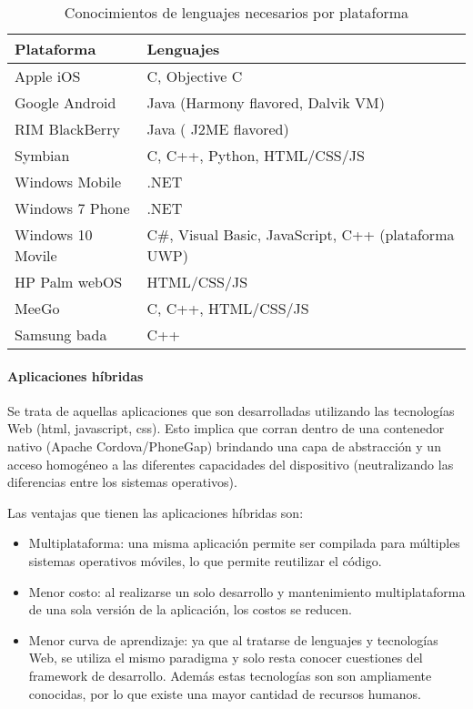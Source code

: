 \begin{table}[]
\centering
\caption{Conocimientos de lenguajes necesarios por plataforma\cite{charland2011mobile}}
\label{languajes_plataforma}
\begin{tabular}{|l|l|}
\hline
\textbf{Plataforma} & \textbf{Lenguajes}                 \\ \hline
Apple iOS           & C, Objective C                     \\ \hline
Google Android      & Java (Harmony flavored, Dalvik VM) \\ \hline
RIM BlackBerry      & Java ( J2ME flavored)              \\ \hline
Symbian             & C, C++, Python, HTML/CSS/JS        \\ \hline
Windows Mobile      & .NET                               \\ \hline
Windows 7 Phone      & .NET                               \\ \hline
Windows 10 Movile      & C\#, Visual Basic, JavaScript, C++ (plataforma UWP)\\ \hline
HP Palm webOS       & HTML/CSS/JS                        \\ \hline
MeeGo               & C, C++, HTML/CSS/JS                \\ \hline
Samsung bada        & C++                                \\ \hline
\end{tabular}
\end{table}

\paragraph{Aplicaciones híbridas}
\label{apps_hibirdas}

Se trata de aquellas aplicaciones que son desarrolladas utilizando las tecnologías Web (\gls{html}, \gls{javascript}, \gls{css}). Esto implica que corran dentro de una contenedor nativo (Apache Cordova/PhoneGap) brindando una capa de abstracción y un acceso homogéneo a las diferentes capacidades del dispositivo (neutralizando las diferencias entre los sistemas operativos).

Las ventajas que tienen las aplicaciones híbridas son:
\begin{itemize}
\item Multiplataforma: una misma aplicación permite ser compilada para múltiples sistemas operativos móviles, lo que permite reutilizar el código.
\item Menor costo: al realizarse un solo desarrollo y mantenimiento multiplataforma de una sola versión de la aplicación, los costos se reducen.
\item Menor curva de aprendizaje: ya que al tratarse de lenguajes y tecnologías Web, se utiliza el mismo paradigma y solo resta conocer cuestiones del \gls{framework} de desarrollo. Además estas tecnologías son  son ampliamente conocidas, por lo que existe una mayor cantidad de recursos humanos.
\end{itemize}

